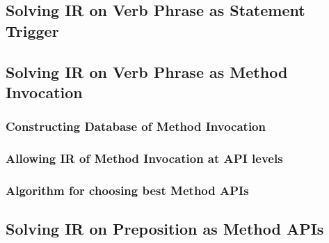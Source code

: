 \subsection{Solving IR on Verb Phrase as Statement Trigger}
\subsection{Solving IR on Verb Phrase as Method Invocation}
\subsubsection{Constructing Database of Method Invocation}
\subsubsection{Allowing IR of Method Invocation at API levels}
\subsubsection{Algorithm for choosing best Method APIs
}
\subsection{Solving IR on Preposition as Method APIs}



